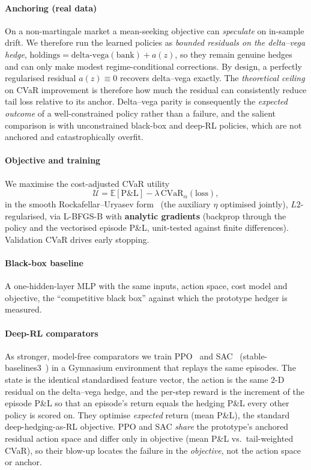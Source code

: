 \documentclass[sigconf,anonymous]{acmart}
\begin{document}
\paragraph{Anchoring (real data)} On a non-martingale market a mean-seeking
objective can \emph{speculate} on in-sample drift. We therefore run the learned
policies as \emph{bounded residuals on the delta--vega hedge},
$\text{holdings} = \text{delta-vega}(\text{bank}) + a(z)$, so they remain genuine
hedges and can only make modest regime-conditional corrections.
By design, a perfectly regularised residual $a(z)\!\equiv\!0$ recovers delta--vega
exactly. The \emph{theoretical ceiling} on CVaR improvement is therefore how
much the residual can consistently reduce tail loss relative to its anchor.
Delta--vega parity is consequently the \emph{expected outcome} of a
well-constrained policy rather than a failure, and the salient comparison
is with unconstrained black-box and deep-RL policies, which are not anchored
and catastrophically overfit.

\paragraph{Objective and training} We maximise the cost-adjusted CVaR utility
\begin{equation}
\mathcal{U} = \mathbb{E}[\mathrm{P\&L}] - \lambda\, \mathrm{CVaR}_{\alpha}(\text{loss}),
\end{equation}
in the smooth Rockafellar--Uryasev form~\cite{rockafellar2000optimization} (the
auxiliary $\eta$ optimised jointly), $L2$-regularised, via L-BFGS-B with
\textbf{analytic gradients} (backprop through the policy and the vectorised
episode P\&L, unit-tested against finite differences). Validation CVaR drives
early stopping.

\paragraph{Black-box baseline} A one-hidden-layer MLP with the same inputs,
action space, cost model and objective, the ``competitive black box'' against
which the prototype hedger is measured.

\paragraph{Deep-RL comparators} As stronger, model-free comparators we train
PPO~\cite{schulman2017ppo} and SAC~\cite{haarnoja2018sac}
(stable-baselines3~\cite{raffin2021sb3}) in a Gymnasium environment that replays
the same episodes. The state is the identical standardised feature vector, the
action is the same $2$-D residual on the delta--vega hedge, and the per-step
reward is the increment of the episode P\&L so that an episode's return equals the
hedging P\&L every other policy is scored on. They optimise \emph{expected} return
(mean P\&L), the standard deep-hedging-as-RL objective. PPO and SAC
\emph{share} the prototype's anchored residual action space and differ only in
objective (mean P\&L vs.\ tail-weighted CVaR), so their blow-up locates the failure in
the \emph{objective}, not the action space or anchor.
\end{document}
